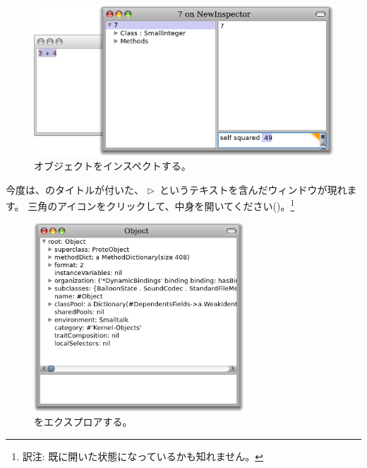 \documentclass[a4paper,10pt,twoside]{book}
\begin{document}
\begin{figure}[htb]
\centerline {\includegraphics[width=\textwidth]{InspectIt}}
\caption{オブジェクトをインスペクトする。}
\end{figure}



今度は、のタイトルが付いた、
\mbox{$\triangleright$ }というテキストを含んだウィンドウが現れます。
三角のアイコンをクリックして、中身を開いてください()。\footnote{訳注: 既に開いた状態になっているかも知れません。}

\begin{figure}[htb]
\centerline {\includegraphics[width=0.7\textwidth]{ExploreIt}}
\caption{をエクスプロアする。}
\end{figure}
\end{document}
